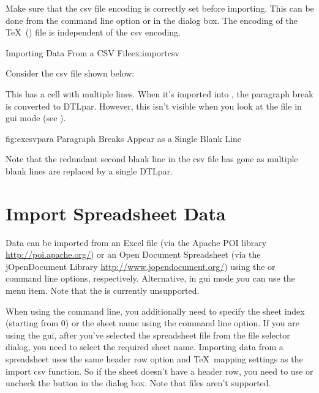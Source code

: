    Make sure that the \gls{csv} file encoding is correctly set
   before importing. This can be done from the 
   command line option or in the 
    dialog box. The encoding
   of the \TeX\ () file is independent of the \gls{csv}
   encoding.

\begin{example}{Importing Data From a CSV File}{ex:importcsv}

   Consider the \gls{csv} file shown below:


   This has a cell with multiple lines. When it's imported into
   , the paragraph break is converted to \gls{DTLpar}.
   However, this isn't visible when you look at the file in 
   \gls{gui} mode (see ).

\FloatFig
 {fig:excsvpara}
 {%
 }
 {Paragraph Breaks Appear as a Single Blank Line}

   Note that the redundant second blank line in the \gls{csv} file
   has gone as multiple blank lines are replaced by a single
   \gls{DTLpar}.
\end{example}

\section{Import Spreadsheet Data}\label{sec:importspread}

   Data can be imported from an Excel  file (via the 
   Apache POI library \url{http://poi.apache.org/})
   or an Open Document Spreadsheet (via the jOpenDocument Library
   \url{http://www.jopendocument.org/}) using the
    or  command line options, respectively.
   Alternative, in \gls{gui} mode you can use the 
    menu item.
   Note that the  is currently unsupported.

 When using the command line,
   you additionally need to specify the sheet index (starting from 0) or the 
   sheet name using the  command line option. If you are 
   using the \gls{gui}, after you've selected the spreadsheet file 
   from the file selector dialog, you need to select the required sheet 
   name.
Importing data from a spreadsheet uses the same header row option and 
   \TeX\ mapping settings as the import \gls{csv} function. 
   So if the sheet doesn't have a header row, you need to use
    or uncheck the
 button 
   in the  dialog box. Note that 
    files aren't supported.



